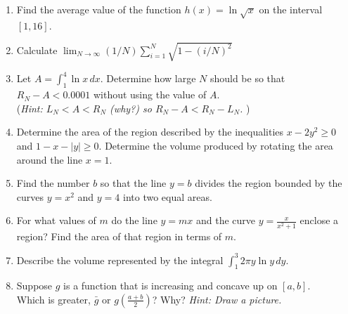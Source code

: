 \documentclass[11pt]{article}
\begin{document}
\begin{enumerate}
{  }

    \vspace{0.1in}
    
\item{Find the average value of the function $h(x)=\ln{\sqrt{x}}$ on the interval $[1,16]$.}
    
\item{Calculate $\lim_{N\to\infty}(1/N) \sum_{i=1}^N\sqrt{1-(i/N)^2}$}

    
    \item{Let $A = \int_1^4 \ln{x}\, dx$.  Determine how large $N$ should be so that $R_N-A < 0.0001$ without using the value of $A$. \\



  (\emph{Hint: $L_N<A<R_N$ (why?) so $R_N-A < R_N-L_N$.  })
}


  \item{Determine the area of the region described by the inequalities $x-2y^2\ge 0$ and $1-x-|y|\ge 0$.  Determine the volume produced by rotating the area around the line $x=1$.}
  \item{Find the number $b$ so that the line $y=b$ divides the region bounded by the curves $y=x^2$ and $y=4$ into
    two equal areas.}
  \item{For what values of $m$ do the line $y=mx$ and the curve $y=\frac{x}{x^2+1}$ enclose a region?  Find the area
    of that region in terms of $m$.}
    

  \item{Describe the volume represented by the integral $\int_1^3 2\pi y\ln{y} \, dy$.}

  \item{Suppose $g$ is a function that is increasing and concave up on $[a,b]$. \\ Which is greater, $\bar{g}$ or $g\left(\frac{a+b}{2}\right)$?  Why? 
  \emph{Hint: Draw a picture.}  }

      \end{enumerate}
\end{document}
